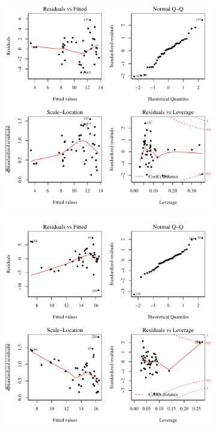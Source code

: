\begin{linenumbers}
\subfiguretop
\begin{landscape}
	\begin{figure}
		\begin{subfigure}{0.7\textwidth}
			\centering
			\includegraphics[width=\tableCustomSize]{"Figures/Results_DSR/Stochastic/Conc Model lm-fit D101C"}
		\end{subfigure}%
		\begin{subfigure}{0.7\textwidth}
			\centering
			\includegraphics[width=\tableCustomSize]{"Figures/Results_DSR/Stochastic/Conc Model lm-fit D106C"}

\end{subfigure}
\end{figure}
\end{landscape}
\end{linenumbers}
